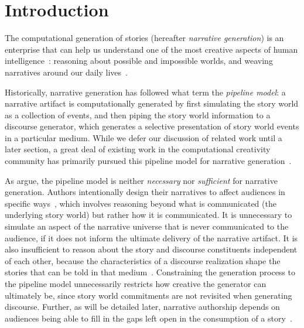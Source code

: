 \section{Introduction}

The computational generation of stories (hereafter {\em narrative
generation}) is an enterprise that can help us understand one of the most
creative aspects of human intelligence~\cite{boyd2009origin}: reasoning
about possible and impossible worlds, and weaving narratives around our
daily lives~\cite{herman2013storytelling}.

Historically, narrative generation has followed what
 term the \emph{pipeline model}: a narrative artifact is
computationally generated by first simulating the story world as a collection of
events, and then piping the story world information to a discourse generator, 
which generates a selective presentation of story world events in a particular 
medium. While we defer our discussion of related  work until a later section, 
a great deal of existing work in the computational creativity community has 
primarily pursued this pipeline model for narrative 
generation~\cite{gervas2009computational}. 

As \citeauthor{ronfard2014story} argue, the pipeline model is neither
\emph{necessary} nor \emph{sufficient} for narrative generation. 
Authors intentionally design their narratives to affect audiences in
specific ways~\cite{chatman1980story,bordwell1989making}, which involves
reasoning beyond what is communicated (the underlying story world) but
rather how it is communicated. It is unnecessary to simulate an aspect of
the narrative universe that is never communicated to the audience, if it
does not inform the ultimate delivery of the narrative artifact. It is also
insufficient to reason about the story and discourse constituents
independent of each other, because the characteristics of a discourse
realization shape the stories that can be told in that
medium~\cite{herman2004toward}. Constraining the generation process to the
pipeline model unnecessarily restricts how creative the generator can
ultimately be, since story world commitments are not revisited when
generating discourse. Further, as will be detailed later, narrative
authorship depends on audiences being able to fill in the gaps left
open in the consumption of a
story~\cite{saraceni2016relatedness,magliano2016filling}.

